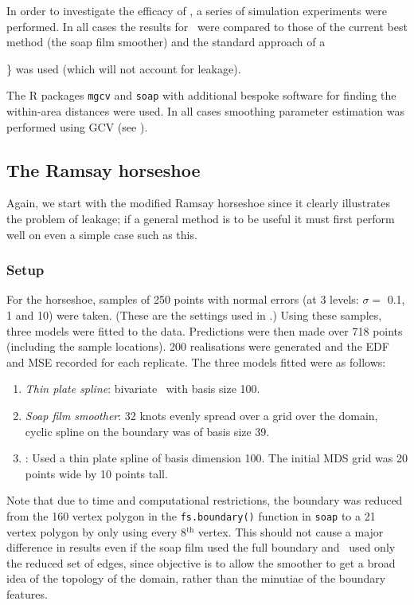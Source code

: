In order to investigate the efficacy of \mdsap, a series of simulation experiments were performed. In all cases the results for \mdsap\ were compared to those of the current best method (the soap film smoother) and the standard approach of a {\tprs\} was used (which will not account for leakage).

The \textsf{R} packages \texttt{mgcv} and \texttt{soap} with additional bespoke software for finding the within-area distances were used. In all cases smoothing parameter estimation was performed using GCV (see ).

\subsection{The Ramsay horseshoe}

Again, we start with the modified Ramsay horseshoe since it clearly illustrates the problem of leakage; if a general method is to be useful it must first perform well on even a simple case such as this.

\subsubsection{Setup}

For the horseshoe, samples of 250 points with normal errors (at 3 levels:  $\sigma= $ 0.1, 1 and 10) were taken. (These are the settings used in \cite{soap}.) Using these samples, three models were fitted to the data. Predictions were then made over 718 points (including the sample locations). 200 realisations were generated and the EDF and MSE recorded for each replicate. The three models fitted were as follows:

\begin{enumerate}
\item \emph{Thin plate spline}: bivariate \tprs\  with basis size 100.
\item \emph{Soap film smoother}: 32 knots evenly spread over a grid over the domain, cyclic spline on the boundary was of basis size 39.
\item \emph{\mdsap}: Used a thin plate spline of basis dimension 100. The initial MDS grid was 20 points wide by 10 points tall.
\end{enumerate} 

Note that due to time and computational restrictions, the boundary was reduced from the 160 vertex polygon in the \texttt{fs.boundary()} function in \texttt{soap} to a 21 vertex polygon by only using every 8$^\text{th}$ vertex. This should not cause a major difference in results even if the soap film used the full boundary and \mdsap\ used only the reduced set of edges, since objective is to allow the smoother to get a broad idea of the topology of the domain, rather than the minutiae of the boundary features.

}
